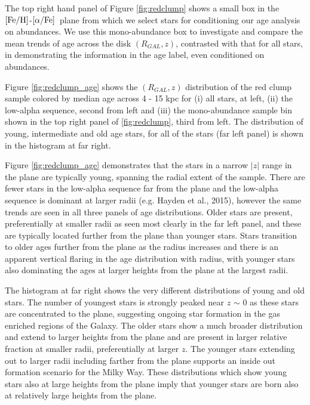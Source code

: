 \documentclass[12pt, preprint]{aastex}
\newcommand{\feh}{\mbox{$\rm [Fe/H]$}}
\newcommand{\alphafe}{\mbox{$\rm [\alpha/Fe]$}}
\begin{document}
The top right hand panel of Figure \ref{fig:redclump} shows a small box in the \feh-\alphafe\ plane from which we select stars for conditioning our age analysis on abundances. We use this mono-abundance box to investigate and compare the mean trends of age across the disk $(R_{GAL},z)$, contrasted with that for all stars, in demonstrating the information in the age label, even conditioned on abundances. 


Figure \ref{fig:redclump_age} shows the $(R_{GAL},z)$ distribution of the red clump sample colored by median age across 4 - 15 kpc for  (i) all stars, at left, (ii) the low-alpha sequence, second from left and (iii) the mono-abundance sample bin shown in the top right panel of \ref{fig:redclump}, third from left. The distribution of young, intermediate and old age stars, for all of the stars (far left panel) is shown in the histogram at far right. 

Figure \ref{fig:redclump_age} demonstrates that the stars in a narrow $|z|$ range in the plane are typically young, spanning the radial extent of the sample. There are fewer stars in the low-alpha sequence far from the plane and the low-alpha sequence is dominant at larger radii (e.g. Hayden et al., 2015), however the same trends are seen in all three panels of age distributions. Older stars are present, preferentially at smaller radii as seen most clearly in the far left panel, and these are typically located further from the plane than younger stars. Stars transition to older ages further from the plane as the radius increases and there is an apparent vertical flaring in the age distribution with radius, with younger stars also dominating the ages at larger heights from the plane at the largest radii. 

The histogram at far right shows the very different distributions of young and old stars. The number of youngest stars is strongly peaked near $z$ $\sim$ 0 as these stars are concentrated to the plane, suggesting ongoing star formation in the gas enriched regions of the Galaxy. The older stars show a much broader distribution and extend to larger heights from the plane and are present in larger relative fraction at smaller radii, preferentially at larger $z$.  The younger stars extending out to larger radii including farther from the plane supports an inside out formation scenario for the Milky Way. These distributions which show young stars also at large heights from the plane imply that younger stars are born also at relatively large heights from the plane.
\end{document}
